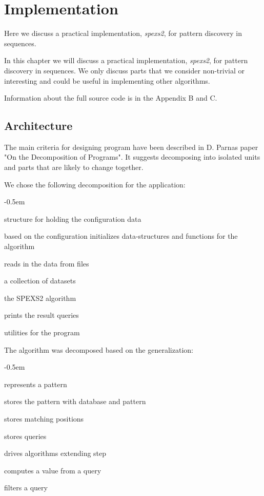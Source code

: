 \chapter{Implementation}

Here we discuss a practical implementation, \emph{spexs2}, for
pattern discovery in sequences. 

In this chapter we will discuss a practical implementation, \emph{spexs2}, for pattern discovery in sequences. We only discuss parts that we consider non-trivial or interesting and could be useful in implementing other algorithms.

Information about the full source code is in the Appendix B and C.

\section{Architecture}

The main criteria for designing program have been described in D. Parnas
paper "On the Decomposition of Programs"\cite{Parnas72}. It suggests decomposing into isolated units and parts that are likely to change together.

We chose the following decomposition for the application:

\begin{small}
\begin{description}
    \itemsep-0.5em
    \item[Configuration] structure for holding the configuration data
    \item[Setup] based on the configuration initializes data-structures and functions for the algorithm
    \item[Reader] reads in the data from files
    \item[Database] a collection of datasets
    \item[Algorithm] the SPEXS2 algorithm
    \item[Printer] prints the result queries
    \item[Debugging] utilities for the program
\end{description}
\end{small}

The algorithm was decomposed based on the generalization:

\begin{small}
\begin{description}
    \itemsep-0.5em
    \item[Pattern] represents a pattern
    \item[Query] stores the pattern with database and pattern
    \item[Set] stores matching positions
    \item[Pool] stores queries
    \item[Extender] drives algorithms extending step
    \item[Feature] computes a value from a query
    \item[Filter] filters a query
\end{description}
\end{small}

